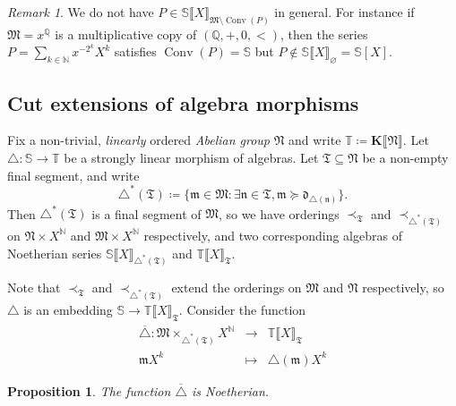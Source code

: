\documentclass{article}
\newcommand{\assign}{\coloneqq}
\newcommand{\nin}{\not\in}
\newcommand{\of}{:}
\newcommand{\suchthat}{:}
\newcommand{\tmem}[1]{{\em #1\/}}
\newcommand{\tmop}[1]{\ensuremath{\operatorname{#1}}}
\newtheorem{proposition}[theorem]{Proposition}
\theoremstyle{remark}\newtheorem*{convention*}{Convention}
\newtheorem{remark}[theorem]{Remark}
\begin{document}
\begin{remark}
  We do not have $P \in \mathbb{S} \llbracket X \rrbracket_{\mathfrak{M}
  \setminus \tmop{Conv} (P)}$ in general. For instance if $\mathfrak{M}=
  x^{\mathbb{Q}}$ is a multiplicative copy of $(\mathbb{Q}, +, 0, <)$, then
  the series $P = \sum_{k \in \mathbb{N}} x^{- 2^k} X^k$ satisfies
  $\tmop{Conv} (P) =\mathbb{S}$ but $P \nin \mathbb{S} \llbracket X
  \rrbracket_{\varnothing} =\mathbb{S} [X]$.
\end{remark}

\subsection{Cut extensions of algebra
morphisms}\label{subsection-cut-extensions}

Fix a non-trivial, {\tmem{linearly}} ordered {\tmem{Abelian group}}
$\mathfrak{N}$ and write $\mathbb{T} \assign \mathbf{K} \llbracket
\mathfrak{N} \rrbracket$. Let $\triangle \of \mathbb{S} \longrightarrow
\mathbb{T}$ be a strongly linear morphism of algebras. Let $\mathfrak{T}
\subseteq \mathfrak{N}$ be a non-empty final segment, and write
\[ \triangle^{\ast} (\mathfrak{T}) \assign \{\mathfrak{m} \in \mathfrak{M}
   \suchthat \exists \mathfrak{n} \in \mathfrak{T}, \mathfrak{m} \succcurlyeq
   \mathfrak{d}_{\triangle (\mathfrak{n})} \} . \]
Then $\triangle^{\ast} (\mathfrak{T})$ is a final segment of $\mathfrak{M}$,
so we have orderings $\prec_{\mathfrak{T}}$ and $\prec_{\triangle^{\ast}
(\mathfrak{T})}$ on $\mathfrak{N} \times X^{\mathbb{N}}$ and $\mathfrak{M}
\times X^{\mathbb{N}}$ respectively, and two corresponding algebras of
Noetherian series $\mathbb{S} \llbracket X \rrbracket_{\triangle^{\ast}
(\mathfrak{T})}$ and $\mathbb{T} \llbracket X \rrbracket_{\mathfrak{T}}$.

Note that $\prec_{\mathfrak{T}}$ and $\prec_{\triangle^{\ast} (\mathfrak{T})}$
extend the orderings on $\mathfrak{M}$ and $\mathfrak{N}$ respectively, so
$\triangle$ is an embedding $\mathbb{S} \longrightarrow \mathbb{T} \llbracket
X \rrbracket_{\mathfrak{T}}$. Consider the function
\begin{eqnarray*}
  \overline{\triangle} \of \mathfrak{M} \times_{\triangle^{\ast}
  (\mathfrak{T})} X^{\mathbb{N}} & \longrightarrow & \mathbb{T} \llbracket X
  \rrbracket_{\mathfrak{T}}\\
  \mathfrak{m}X^k & \longmapsto & \triangle (\mathfrak{m}) X^k
\end{eqnarray*}
\begin{proposition}
  \label{prop-Noeth-ext-comp}The function $\overline{\triangle}$ is
  Noetherian.
\end{proposition}
\end{document}
